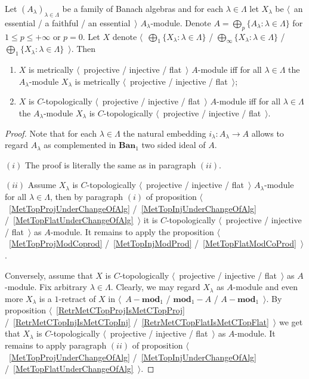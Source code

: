 \begin{proposition}\label{MetTopProjInjFlatUnderSumOfAlg} Let
${(A_\lambda)}_{\lambda\in\Lambda}$ be a family of Banach algebras and for each
$\lambda\in\Lambda$ let $X_\lambda$ be $\langle$~an essential / a faithful / an
essential~$\rangle$ $A_\lambda$-module. Denote $A=\bigoplus_p
\{A_\lambda:\lambda\in\Lambda \}$ for $1\leq p\leq +\infty$ or $p=0$. Let $X$
denote $\langle$~$\bigoplus_1 \{X_\lambda:\lambda\in\Lambda \}$ /
$\bigoplus_\infty \{X_\lambda:\lambda\in\Lambda \}$ / 
$\bigoplus_1 \{X_\lambda:\lambda\in\Lambda \}$~$\rangle$. Then

\begin{enumerate}[label = (\roman*)]
    \item $X$ is metrically $\langle$~projective / injective / flat~$\rangle$
    $A$-module iff for all $\lambda\in\Lambda$ the $A_\lambda$-module
    $X_\lambda$ is metrically $\langle$~projective / injective / flat~$\rangle$;

    \item $X$ is $C$-topologically $\langle$~projective / injective /
    flat~$\rangle$ $A$-module iff for all $\lambda\in\Lambda$ the
    $A_\lambda$-module $X_\lambda$ is $C$-topologically $\langle$~projective /
    injective / flat~$\rangle$.
\end{enumerate}
\end{proposition}
\begin{proof} Note that for each $\lambda\in\Lambda$ the natural embedding
$i_\lambda:A_\lambda\to A$ allows to regard $A_\lambda$ as complemented in
$\mathbf{Ban}_1$ two sided ideal of $A$.

$(i)$ The proof is literally the same as in paragraph $(ii)$.

$(ii)$ Assume $X_\lambda$ is $C$-topologically $\langle$~projective / injective
/ flat~$\rangle$ $A_\lambda$-module for all $\lambda\in\Lambda$, then by
paragraph $(i)$ of proposition $\langle$~\ref{MetTopProjUnderChangeOfAlg}
/~\ref{MetTopInjUnderChangeOfAlg} /~\ref{MetTopFlatUnderChangeOfAlg}~$\rangle$
it is $C$-topologically $\langle$~projective / injective / flat~$\rangle$ as
$A$-module. It remains to apply the proposition
$\langle$~\ref{MetTopProjModCoprod} /~\ref{MetTopInjModProd}
/~\ref{MetTopFlatModCoProd}~$\rangle$. 

Conversely, assume that $X$ is $C$-topologically $\langle$~projective /
injective / flat~$\rangle$ as $A$-module. Fix arbitrary $\lambda\in\Lambda$.
Clearly, we may regard $X_\lambda$ as $A$-module and even more $X_\lambda$ is a
$1$-retract of $X$ in $\langle$~$A-\mathbf{mod}_1$ / $\mathbf{mod}_1-A$ /
$A-\mathbf{mod}_1$~$\rangle$. By proposition
$\langle$~\ref{RetrMetCTopProjIsMetCTopProj} /~\ref{RetrMetCTopInjIsMetCTopInj}
/~\ref{RetrMetCTopFlatIsMetCTopFlat}~$\rangle$ we get that $X_\lambda$ is
$C$-topologically $\langle$~projective / injective / flat~$\rangle$ as
$A$-module. It remains to apply paragraph $(ii)$ of proposition
$\langle$~\ref{MetTopProjUnderChangeOfAlg} /~\ref{MetTopInjUnderChangeOfAlg}
/~\ref{MetTopFlatUnderChangeOfAlg}~$\rangle$.
\end{proof} 


